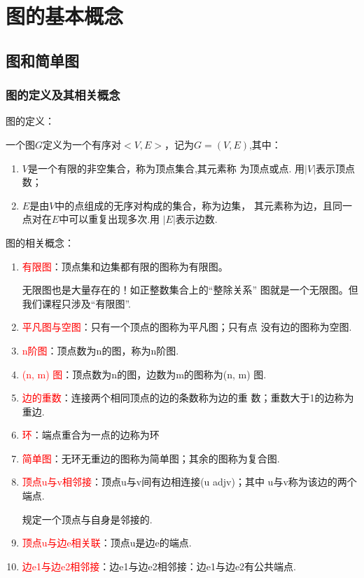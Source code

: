 \newpage
\section{图的基本概念}
\subsection{图和简单图}
\subsubsection{图的定义及其相关概念}

\noindent 图的定义：
\begin{definition}
	一个图$G$定义为一个有序对$<V,E>$，记为$G=(V,E)$,其中：
	\begin{enumerate}
		\item $V$是一个有限的非空集合，称为顶点集合,其元素称
		为顶点或点. 用$|V|$表示顶点数；
		\item $E$是由$V$中的点组成的无序对构成的集合，称为边集，
		其元素称为边，且同一点对在$E$中可以重复出现多次.用
		$|E|$表示边数.
	\end{enumerate}
\end{definition}

\noindent 图的相关概念：
\begin{enumerate}
	\item \textcolor{red}{有限图}：顶点集和边集都有限的图称为有限图。
	\begin{note}
		无限图也是大量存在的！如正整数集合上的“整除关系”
	图就是一个无限图。但我们课程只涉及“有限图”.
	\end{note}
	\item \textcolor{red}{平凡图与空图}：只有一个顶点的图称为平凡图；只有点
	没有边的图称为空图.
	\item \textcolor{red}{n阶图}：顶点数为n的图，称为n阶图.
	\item \textcolor{red}{(n, m) 图}：顶点数为n的图，边数为m的图称为(n, m) 图.
	\item \textcolor{red}{边的重数}：连接两个相同顶点的边的条数称为边的重
	数；重数大于1的边称为重边.
	\item \textcolor{red}{环}：端点重合为一点的边称为环
	\item \textcolor{red}{简单图}：无环无重边的图称为简单图；其余的图称为复合图.
	\item \textcolor{red}{顶点u与v相邻接}：顶点u与v间有边相连接(u adjv)；其中
	u与v称为该边的两个端点.
		\begin{note}
		规定一个顶点与自身是邻接的.
		\end{note}
	\item \textcolor{red}{顶点u与边e相关联}：顶点u是边e的端点.
	\item \textcolor{red}{边e1与边e2相邻接}：边e1与边e2相邻接：边e1与边e2有公共端点.
\end{enumerate}

